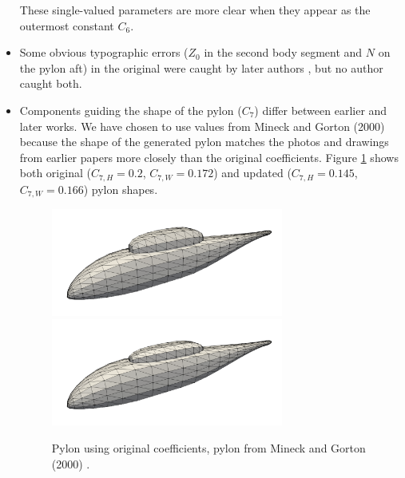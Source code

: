 \documentclass[journal]{new-aiaa}
\begin{document}
\begin{itemize}
These single-valued parameters are more clear when they appear as the outermost constant $C_{6}$.
\item Some obvious typographic errors ($Z_0$ in the second body segment and $N$ on the pylon aft)
in the original \cite{nasa80051} were caught by later authors \cite{nasa87762,mineckgorton}, but no author caught both.
\item Components guiding the shape of the pylon ($C_{7}$) differ between earlier and later works.
We have chosen to use values from Mineck and Gorton (2000) \cite{mineckgorton} because the shape of the generated 
pylon matches the photos and drawings from earlier papers more closely \cite{nasa80051,nasa87762} than the original coefficients.
Figure \ref{badpylon} shows both original ($C_{7,H} = 0.2$, $C_{7,W} = 0.172$) and
updated ($C_{7,H} = 0.145$, $C_{7,W} = 0.166$) pylon shapes.
\begin{figure} \begin{centering}
\includegraphics[width=3.0in]{img_badpylon.png}
\includegraphics[width=3.0in]{img_good.png}
\caption{Pylon using original coefficients, pylon from Mineck and Gorton (2000) \cite{mineckgorton}.}
\label{badpylon}
\end{centering}\end{figure}%
\end{itemize}
\end{document}
